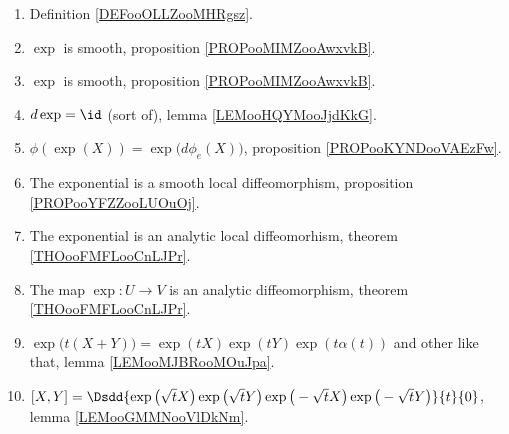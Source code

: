 \begin{enumerate}
	\item
	      Definition \ref{DEFooOLLZooMHRgsz}.
	\item
	      \( \exp\) is smooth, proposition \ref{PROPooMIMZooAwxvkB}.
	\item
	      \( \exp\) is smooth, proposition \ref{PROPooMIMZooAwxvkB}.
	\item
	      \( d\exp=\id\) (sort of), lemma \ref{LEMooHQYMooJjdKkG}.
	\item
	      \( \phi(\exp(X))=\exp\big( d\phi_e(X) \big)\), proposition \ref{PROPooKYNDooVAEzFw}.
	\item
	      The exponential is a smooth local diffeomorphism, proposition \ref{PROPooYFZZooLUOuOj}.
	\item
	      The exponential is an analytic local diffeomorhism, theorem \ref{THOooFMFLooCnLJPr}.
	\item
	      The map \( \exp\colon U\to V\) is an analytic diffeomorphism, theorem \ref{THOooFMFLooCnLJPr}.
	\item
	      \( \exp\big( t(X+Y) \big)=\exp(tX)\exp(tY)\exp(t\alpha(t))\) and other like that, lemma \ref{LEMooMJBRooMOuJpa}.
	\item
	      $[X,Y]=\Dsdd{ \exp\big( \sqrt{ t }X \big)\exp\big( \sqrt{ t }Y \big)\exp\big( -\sqrt{ t }X \big)\exp\big( -\sqrt{ t }Y \big) }{t}{0}$, lemma \ref{LEMooGMMNooVlDkNm}.
\end{enumerate}
